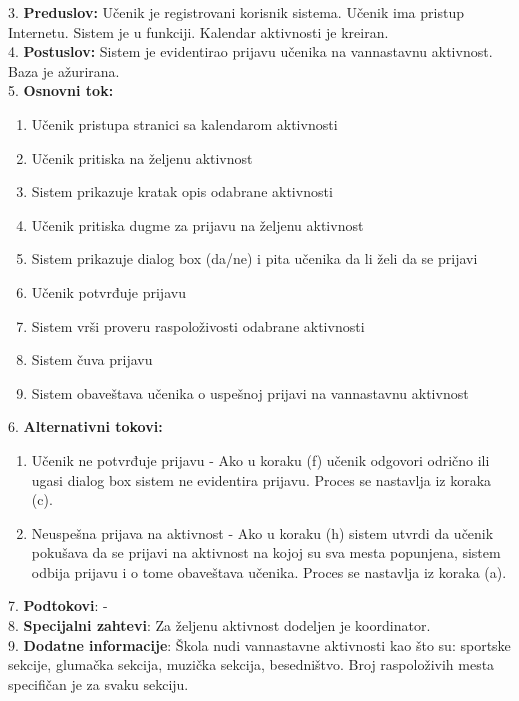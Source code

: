 \documentclass{article}
\begin{document}
3. \textbf{Preduslov:} Učenik je registrovani korisnik sistema. Učenik ima pristup Internetu. Sistem je u funkciji. Kalendar aktivnosti je kreiran. \\

4. \textbf{Postuslov:} Sistem je evidentirao prijavu učenika na vannastavnu aktivnost. Baza je ažurirana. \\

5. \textbf{Osnovni tok:} 
\begin{enumerate} [label=(\alph*)]
\item Učenik pristupa stranici sa kalendarom aktivnosti
\item Učenik pritiska na željenu aktivnost
\item Sistem prikazuje kratak opis odabrane aktivnosti
\item Učenik pritiska dugme za prijavu na željenu aktivnost
\item Sistem prikazuje dialog box (da/ne) i pita učenika da li želi da se prijavi
\item Učenik potvrđuje prijavu
\item Sistem vrši proveru raspoloživosti odabrane aktivnosti
\item Sistem čuva prijavu
\item Sistem obaveštava učenika o uspešnoj prijavi na vannastavnu aktivnost
\end{enumerate}

6. \textbf{Alternativni tokovi:}
\begin{enumerate} [label=(\roman*)]
\item Učenik ne potvrđuje prijavu - Ako u koraku (f) učenik odgovori odrično ili ugasi dialog box sistem ne evidentira prijavu. Proces se nastavlja iz koraka (c). 
\item Neuspešna prijava na aktivnost - Ako u koraku (h) sistem utvrdi da učenik pokušava da se prijavi na aktivnost na kojoj su sva mesta popunjena, sistem odbija prijavu i o tome obaveštava učenika. Proces se nastavlja iz koraka (a).

\end{enumerate}

7. \textbf{Podtokovi}: - \\

8. \textbf{Specijalni zahtevi}: Za željenu aktivnost dodeljen je koordinator. \\

9. \textbf{Dodatne informacije}: Škola nudi vannastavne aktivnosti kao što su: sportske sekcije, glumačka sekcija, muzička sekcija, besedništvo. Broj raspoloživih mesta specifičan je za svaku sekciju. \\
\end{document}
